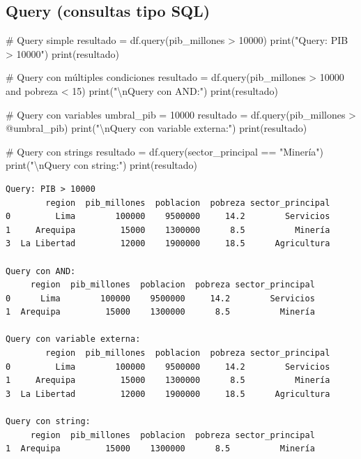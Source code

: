 \documentclass[
  doc,
  floatsintext,
  longtable,
  a4paper,
  nolmodern,
  notxfonts,
  notimes,
  12pt,
  colorlinks=true,linkcolor=blue,citecolor=blue,urlcolor=blue]{apa7}
\newenvironment{Shaded}{\begin{snugshade}}{\end{snugshade}}
\newcommand{\BuiltInTok}[1]{\textcolor[rgb]{0.00,0.23,0.31}{#1}}
\newcommand{\CharTok}[1]{\textcolor[rgb]{0.13,0.47,0.30}{#1}}
\newcommand{\CommentTok}[1]{\textcolor[rgb]{0.37,0.37,0.37}{#1}}
\newcommand{\DecValTok}[1]{\textcolor[rgb]{0.68,0.00,0.00}{#1}}
\newcommand{\NormalTok}[1]{\textcolor[rgb]{0.00,0.23,0.31}{#1}}
\newcommand{\OperatorTok}[1]{\textcolor[rgb]{0.37,0.37,0.37}{#1}}
\newcommand{\StringTok}[1]{\textcolor[rgb]{0.13,0.47,0.30}{#1}}
\begin{document}
\subsection{Query (consultas tipo SQL)}\label{query-consultas-tipo-sql}

\begin{Shaded}
\begin{Highlighting}[]
\CommentTok{\# Query simple}
\NormalTok{resultado }\OperatorTok{=}\NormalTok{ df.query(}\StringTok{\textquotesingle{}pib\_millones \textgreater{} 10000\textquotesingle{}}\NormalTok{)}
\BuiltInTok{print}\NormalTok{(}\StringTok{"Query: PIB \textgreater{} 10000"}\NormalTok{)}
\BuiltInTok{print}\NormalTok{(resultado)}

\CommentTok{\# Query con múltiples condiciones}
\NormalTok{resultado }\OperatorTok{=}\NormalTok{ df.query(}\StringTok{\textquotesingle{}pib\_millones \textgreater{} 10000 and pobreza \textless{} 15\textquotesingle{}}\NormalTok{)}
\BuiltInTok{print}\NormalTok{(}\StringTok{"}\CharTok{\textbackslash{}n}\StringTok{Query con AND:"}\NormalTok{)}
\BuiltInTok{print}\NormalTok{(resultado)}

\CommentTok{\# Query con variables}
\NormalTok{umbral\_pib }\OperatorTok{=} \DecValTok{10000}
\NormalTok{resultado }\OperatorTok{=}\NormalTok{ df.query(}\StringTok{\textquotesingle{}pib\_millones \textgreater{} @umbral\_pib\textquotesingle{}}\NormalTok{)}
\BuiltInTok{print}\NormalTok{(}\StringTok{"}\CharTok{\textbackslash{}n}\StringTok{Query con variable externa:"}\NormalTok{)}
\BuiltInTok{print}\NormalTok{(resultado)}

\CommentTok{\# Query con strings}
\NormalTok{resultado }\OperatorTok{=}\NormalTok{ df.query(}\StringTok{\textquotesingle{}sector\_principal == "Minería"\textquotesingle{}}\NormalTok{)}
\BuiltInTok{print}\NormalTok{(}\StringTok{"}\CharTok{\textbackslash{}n}\StringTok{Query con string:"}\NormalTok{)}
\BuiltInTok{print}\NormalTok{(resultado)}
\end{Highlighting}
\end{Shaded}

\begin{verbatim}
Query: PIB > 10000
        region  pib_millones  poblacion  pobreza sector_principal
0         Lima        100000    9500000     14.2        Servicios
1     Arequipa         15000    1300000      8.5          Minería
3  La Libertad         12000    1900000     18.5      Agricultura

Query con AND:
     region  pib_millones  poblacion  pobreza sector_principal
0      Lima        100000    9500000     14.2        Servicios
1  Arequipa         15000    1300000      8.5          Minería

Query con variable externa:
        region  pib_millones  poblacion  pobreza sector_principal
0         Lima        100000    9500000     14.2        Servicios
1     Arequipa         15000    1300000      8.5          Minería
3  La Libertad         12000    1900000     18.5      Agricultura

Query con string:
     region  pib_millones  poblacion  pobreza sector_principal
1  Arequipa         15000    1300000      8.5          Minería
\end{verbatim}
\end{document}

